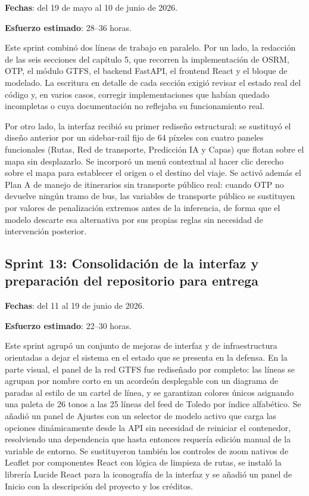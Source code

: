\textbf{Fechas}: del 19 de mayo al 10 de junio de 2026.

\textbf{Esfuerzo estimado}: 28--36 horas.

Este sprint combinó dos líneas de trabajo en paralelo. Por un lado, la redacción de las seis secciones del capítulo 5, que recorren la implementación de OSRM, OTP, el módulo GTFS, el backend FastAPI, el frontend React y el bloque de modelado. La escritura en detalle de cada sección exigió revisar el estado real del código y, en varios casos, corregir implementaciones que habían quedado incompletas o cuya documentación no reflejaba su funcionamiento real.

Por otro lado, la interfaz recibió su primer rediseño estructural: se sustituyó el diseño anterior por un sidebar-rail fijo de 64 píxeles con cuatro paneles funcionales (Rutas, Red de transporte, Predicción IA y Capas) que flotan sobre el mapa sin desplazarlo. Se incorporó un menú contextual al hacer clic derecho sobre el mapa para establecer el origen o el destino del viaje. Se activó además el Plan A de manejo de itinerarios sin transporte público real: cuando OTP no devuelve ningún tramo de bus, las variables de transporte público se sustituyen por valores de penalización extremos antes de la inferencia, de forma que el modelo descarte esa alternativa por sus propias reglas sin necesidad de intervención posterior.

\subsection{Sprint 13: Consolidación de la interfaz y preparación del repositorio para entrega}

\textbf{Fechas}: del 11 al 19 de junio de 2026.

\textbf{Esfuerzo estimado}: 22--30 horas.

Este sprint agrupó un conjunto de mejoras de interfaz y de infraestructura orientadas a dejar el sistema en el estado que se presenta en la defensa. En la parte visual, el panel de la red GTFS fue rediseñado por completo: las líneas se agrupan por nombre corto en un acordeón desplegable con un diagrama de paradas al estilo de un cartel de línea, y se garantizan colores únicos asignando una paleta de 26 tonos a las 25 líneas del feed de Toledo por índice alfabético. Se añadió un panel de Ajustes con un selector de modelo activo que carga las opciones dinámicamente desde la API sin necesidad de reiniciar el contenedor, resolviendo una dependencia que hasta entonces requería edición manual de la variable de entorno. Se sustituyeron también los controles de zoom nativos de Leaflet por componentes React con lógica de limpieza de rutas, se instaló la librería Lucide React para la iconografía de la interfaz y se añadió un panel de Inicio con la descripción del proyecto y los créditos.

